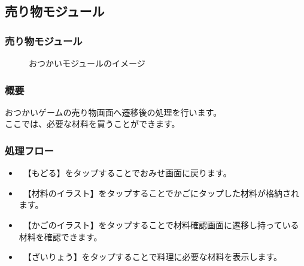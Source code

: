 \documentclass[a4j]{jarticle}
\begin{document}
\newpage
\subsection{売り物モジュール}
\subsubsection{売り物モジュール\label{売り物}}
\begin{figure}[H]
    \begin{center}
    \caption {おつかいモジュールのイメージ}
    \label{functionselection}
    \end{center}
\end{figure}

\subsubsection*{概要}
おつかいゲームの売り物画面へ遷移後の処理を行います。\\
ここでは、必要な材料を買うことができます。

\subsubsection*{処理フロー}
\begin{itemize}
\item　【もどる】をタップすることでおみせ画面に戻ります。
\item　【材料のイラスト】をタップすることでかごにタップした材料が格納されます。
\item　【かごのイラスト】をタップすることで材料確認画面に遷移し持っている材料を確認できます。
\item　【ざいりょう】をタップすることで料理に必要な材料を表示します。
\end{itemize}
\end{document}
